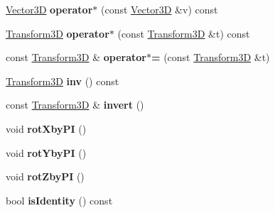 \begin{DoxyCompactItemize}
\hyperlink{classTVec3D}{Vector3D} {\bfseries operator$\ast$} (const \hyperlink{classTVec3D}{Vector3D} \&v) const
\item 
\mbox{\label{classTransform3D_a6b2dcd2ef4c36bb9c0bd166a05359650}} 
\hyperlink{classTransform3D}{Transform3D} {\bfseries operator$\ast$} (const \hyperlink{classTransform3D}{Transform3D} \&t) const
\item 
\mbox{\label{classTransform3D_afd208dcef6aba82ca8ac6d24c1950564}} 
const \hyperlink{classTransform3D}{Transform3D} \& {\bfseries operator$\ast$=} (const \hyperlink{classTransform3D}{Transform3D} \&t)
\item 
\mbox{\label{classTransform3D_aadd90cd8d736684754f135916db54323}} 
\hyperlink{classTransform3D}{Transform3D} {\bfseries inv} () const
\item 
\mbox{\label{classTransform3D_a5a71b7497c14037d85181f6cf0655e1e}} 
const \hyperlink{classTransform3D}{Transform3D} \& {\bfseries invert} ()
\item 
\mbox{\label{classTransform3D_a49dc47c8f2c5891b2567359fa2dc6e11}} 
void {\bfseries rot\+Xby\+PI} ()
\item 
\mbox{\label{classTransform3D_a37e6f1943026f4187acf36a6c1513a02}} 
void {\bfseries rot\+Yby\+PI} ()
\item 
\mbox{\label{classTransform3D_ab499a53c5f50c4121343886ddd849cba}} 
void {\bfseries rot\+Zby\+PI} ()
\item 
\mbox{\label{classTransform3D_a0990cef3a1181b74c9c6880dfad0ebcc}} 
bool {\bfseries is\+Identity} () const
\end{DoxyCompactItemize}
